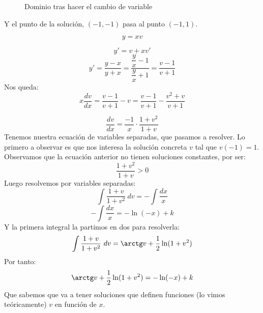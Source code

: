 \begin{ejemplo}
\begin{figure}[H]
\caption{Dominio tras hacer el cambio de variable}
\end{figure}

 Y el punto de la solución, $(-1,-1)$ pasa al punto $(-1,1)$.

 \begin{equation*}
     y = xv
 \end{equation*}

 \begin{equation*}
     y' = v + xv'
 \end{equation*}
 \begin{equation*}
     y' = \dfrac{y-x}{y+x} = \dfrac{\dfrac{y}{x}-1}{\dfrac{y}{x}+1} = \dfrac{v-1}{v+1}
 \end{equation*}
 Nos queda:
 \begin{equation*}
     x\dfrac{dv}{dx} = \dfrac{v-1}{v+1} - v = \dfrac{v-1}{v+1} -\dfrac{v^2 + v}{v+1}
 \end{equation*}

 \begin{equation*}
     \dfrac{dv}{dx} = \dfrac{-1}{x}\cdot \dfrac{1+v^2}{1+v}
 \end{equation*}
 Tenemos nuestra ecuación de variables separadas, que pasamos a resolver. Lo primero a observar es que nos interesa la solución concreta $v$ tal que $v(-1)=1$.\\

 Observamos que la ecuación anterior no tienen soluciones constantes, por ser:
 \begin{equation*}
     \dfrac{1+v^2}{1+v} > 0
 \end{equation*}
 Luego resolvemos por variables separadas:
 \begin{equation*}
     \int \dfrac{1+v}{1+v^2}~dv = -\int \dfrac{dx}{x}
 \end{equation*}
 \begin{equation*}
     -\int \dfrac{dx}{x}= -\ln(-x) + k
 \end{equation*}
 Y la primera integral la partimos en dos para resolverla:
 \begin{equation*}
     \int \dfrac{1+v}{1+v^2}~dv = \arctg v +\dfrac{1}{2}\ln(1+v^2)
 \end{equation*}
 Por tanto:
 \begin{equation*}
     \arctg v + \dfrac{1}{2}\ln(1+v^2) = -\ln(-x) + k
 \end{equation*}
 Que sabemos que va a tener soluciones que definen funciones (lo vimos teóricamente) $v$ en función de $x$.\\


\end{ejemplo}
